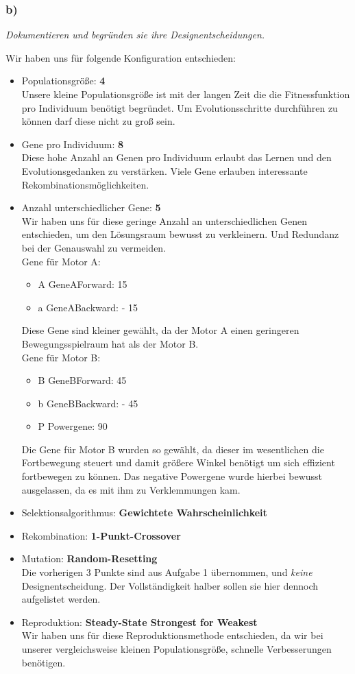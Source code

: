 \documentclass[12pt, a4paper]{article}
\begin{document}
\subsubsection*{b)}
\textit{Dokumentieren und begründen sie ihre Designentscheidungen.}

Wir haben uns für folgende Konfiguration entschieden:

\begin{itemize}
\item Populationsgröße: \textbf{4}\\
Unsere kleine Populationsgröße ist mit der langen Zeit die die
Fitnessfunktion pro Individuum benötigt begründet. Um
Evolutionsschritte durchführen zu können darf diese nicht zu groß sein.
\item Gene pro Individuum: \textbf{8}\\
Diese hohe Anzahl an Genen pro Individuum erlaubt das Lernen und den
Evolutionsgedanken zu verstärken. Viele Gene erlauben interessante Rekombinationsmöglichkeiten.
\item Anzahl unterschiedlicher Gene: \textbf{5}\\
Wir haben uns für diese geringe Anzahl an unterschiedlichen Genen
entschieden, um den Lösungsraum bewusst zu verkleinern. Und Redundanz
bei der Genauswahl zu vermeiden.\\
Gene für Motor A:
\begin{itemize}
\item A GeneAForward: 15\degree
\item a GeneABackward: - 15\degree
\end{itemize}
Diese Gene sind kleiner gewählt, da der Motor A einen geringeren Bewegungsspielraum hat als der Motor B.\\
Gene für Motor B:
\begin{itemize}
\item B GeneBForward: 45\degree
\item b GeneBBackward: - 45\degree
\item P Powergene: 90\degree
\end{itemize}
Die Gene für Motor B wurden so gewählt, da dieser im wesentlichen die Fortbewegung steuert und damit größere Winkel benötigt um sich effizient fortbewegen zu können. Das negative Powergene wurde hierbei bewusst ausgelassen, da es mit ihm zu Verklemmungen kam.
\item Selektionsalgorithmus: \textbf{Gewichtete Wahrscheinlichkeit}
\item Rekombination: \textbf{1-Punkt-Crossover}
\item Mutation: \textbf{Random-Resetting}\\
Die vorherigen 3 Punkte sind aus Aufgabe 1 übernommen, und
\textit{keine} Designentscheidung. Der Vollständigkeit halber sollen sie hier
dennoch aufgelistet werden.
\item Reproduktion: \textbf{Steady-State Strongest for Weakest}\\
Wir haben uns für diese Reproduktionsmethode entschieden, da wir bei
unserer vergleichsweise kleinen Populationsgröße, schnelle
Verbesserungen benötigen.

\end{itemize}
\end{document}

